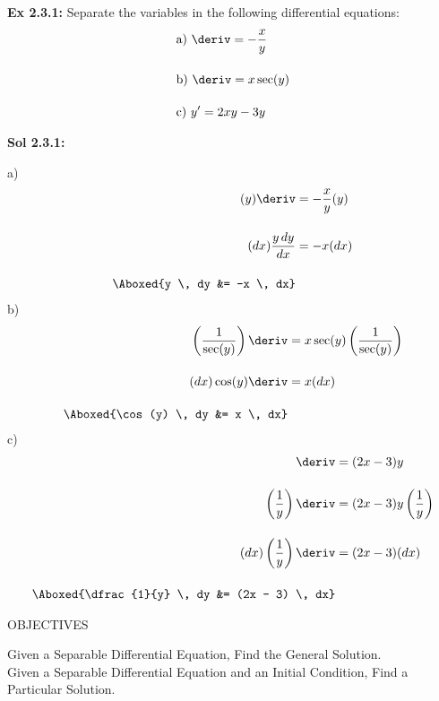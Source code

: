 \begin{tcolorbox}[example]
    \textbf{Ex 2.3.1: } Separate the variables in the following differential equations: \begin{align*}
        & \text{a) } \deriv = -\dfrac{x}{y} \\[11pt]
        & \text{b) } \deriv = x\sec (y) \\[11pt]
        & \text{c) } y' = 2xy - 3y
    \end{align*}
\end{tcolorbox}
\begin{tcolorbox}[solution]
    \textbf{Sol 2.3.1: } \par
    a) \begin{align*}
        (y)\deriv &= -\dfrac{x}{y}(y) \\[11pt]
        (dx)\dfrac{y \, dy}{dx} &= -x(dx) \\[11pt]
        \Aboxed{y \, dy &= -x \, dx}
    \end{align*}
    b) \begin{align*}
        \left(\dfrac{1}{\sec (y)}\right)\deriv &= x\sec (y)\left(\dfrac{1}{\sec (y)}\right) \\[11pt]
        (dx)\cos (y)\deriv &= x(dx) \\[11pt]
        \Aboxed{\cos (y) \, dy &= x \, dx}
    \end{align*}
    c) \begin{align*}
        \deriv &= (2x - 3)y \\[11pt]
        \left(\dfrac{1}{y}\right)\deriv &= (2x - 3)y\left(\dfrac{1}{y}\right) \\[11pt]
        (dx)\left(\dfrac{1}{y}\right)\deriv &= (2x - 3)(dx) \\[11pt]
        \Aboxed{\dfrac{1}{y} \, dy &= (2x - 3) \, dx}
    \end{align*}
\end{tcolorbox} \vspace{11pt}

\begin{tcolorbox}[objective]
    \begin{center}
        OBJECTIVES \\[11pt]
    \end{center}
    Given a Separable Differential Equation, Find the General Solution. \\
    Given a Separable Differential Equation and an Initial Condition, Find a Particular Solution. 
\end{tcolorbox} \vspace{11pt}

